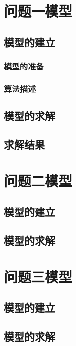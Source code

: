 \documentclass[withoutpreface,bwprint]{cumcmthesis}
\begin{document}
	
	\section{问题一模型}
	\subsection{模型的建立}
	
	\subsubsection{模型的准备}
	
	\subsubsection{算法描述}
	
	\subsection{模型的求解}
	
	
	\subsection{求解结果}
	
	\section{问题二模型}
	\subsection{模型的建立}
	
	
	\subsection{模型的求解}
	
	\section{问题三模型}
	\subsection{模型的建立}
	
	
	\subsection{模型的求解}
	
	
\end{document}
